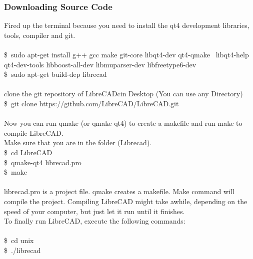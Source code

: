 \subsubsection{Downloading Source Code}

Fired up the terminal because you need to install the qt4 development libraries, tools, compiler and git.\\ \\
\$\ sudo apt-get install g++ gcc make git-core libqt4-dev qt4-qmake \
libqt4-help qt4-dev-tools libboost-all-dev libmuparser-dev libfreetype6-dev \\
\$\ sudo apt-get build-dep librecad\\ \\
clone the git repository of LibreCADcin Desktop (You can use any Directory)\\
\$\ git clone https://github.com/LibreCAD/LibreCAD.git \\ \\
Now you can run qmake (or qmake-qt4) to create a makefile and run make to compile LibreCAD. \\
Make sure that you are in the folder (Librecad).\\
\$\ cd LibreCAD \\
\$\ qmake-qt4 librecad.pro\\
\$\ make\\\\
librecad.pro  is  a  project  file.  qmake  creates  a  makefile.  Make  command  will  compile  the  project.
Compiling  LibreCAD  might  take  awhile,   depending  on  the  speed  of  your  computer,  but  just  let  it  run
until it finishes.\\
To finally run LibreCAD, execute the following commands:\\\\
\$\ cd unix\\
\$\ ./librecad

